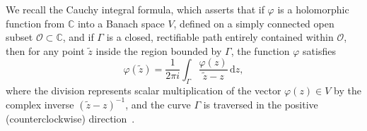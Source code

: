 \documentclass[12pt]{article}
\theoremstyle{remark}
\theoremstyle{definition}
\numberwithin{equation}{section}
\begin{document}
We recall the Cauchy integral formula, which asserts that if $\varphi$ is a holomorphic function from $\mathbb{C}$ into a Banach space $V$, defined on a simply connected open subset $\mathcal{O} \subset \mathbb{C}$, and if $\Gamma$ is a closed, rectifiable path entirely contained within $\mathcal{O}$, then for any point $\tilde{z}$ inside the region bounded by $\Gamma$, the function $\varphi$ satisfies
\begin{equation}
    \varphi(\tilde{z}) = \frac{1}{2\pi i} \int_{\Gamma} \frac{\varphi(z)}{\tilde{z} - z} \, \mathrm{d}z,
    \label{cauchy}
\end{equation}
where the division represents scalar multiplication of the vector $\varphi(z) \in V$ by the complex inverse $(\tilde{z} - z)^{-1}$, and the curve $\Gamma$ is traversed in the positive (counterclockwise) direction~\cite{Hervé+1989}.
\end{document}
